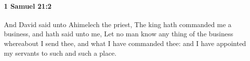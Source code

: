 
		\paragraph{1 Samuel 21:2} %
			\label{1SAMUEL-21-2}

			And David said unto Ahimelech the priest, The king hath commanded me a business, and hath said unto me, Let no man know any thing of the business whereabout I send thee, and what I have commanded thee: and I have appointed my servants to such and such a place.


